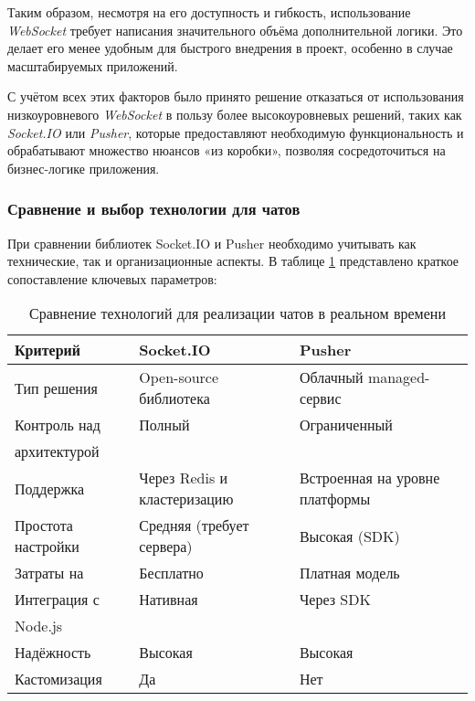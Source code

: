 Таким образом, несмотря на его доступность и гибкость, использование \textit{WebSocket} требует написания значительного объёма дополнительной логики. Это делает его менее удобным для быстрого внедрения в проект, особенно в случае масштабируемых приложений.

С учётом всех этих факторов было принято решение отказаться от использования низкоуровневого \textit{WebSocket} в пользу более высокоуровневых решений, таких как \textit{Socket.IO} или \textit{Pusher}, которые предоставляют необходимую функциональность и обрабатывают множество нюансов «из коробки», позволяя сосредоточиться на бизнес-логике приложения.


\subsubsection*{Сравнение и выбор технологии для чатов}

При сравнении библиотек Socket.IO и Pusher необходимо учитывать как технические, так и организационные аспекты. В таблице \ref{tab:chat-comparison} представлено краткое сопоставление ключевых параметров:

\begin{table}[h]
  \centering
  \caption{Сравнение технологий для реализации чатов в реальном времени}
  \small
  \label{tab:chat-comparison}
  \begin{tabular}{|l|p{5cm}|p{5cm}|}
    \hline
    \textbf{Критерий} & \textbf{Socket.IO}               & \textbf{Pusher}                 \\ \hline
    Тип решения      & Open-source библиотека           & Облачный managed-сервис         \\ \hline
    Контроль над     & Полный                           & Ограниченный                    \\ 
    архитектурой     &                                  &                                 \\ \hline
    Поддержка        & Через Redis и кластеризацию      & Встроенная на уровне платформы  \\ \hline
    Простота настройки & Средняя (требует сервера)      & Высокая (SDK)                   \\ \hline
    Затраты на       & Бесплатно                        & Платная модель                  \\ \hline
    Интеграция с     & Нативная                         & Через SDK                       \\ 
    Node.js          &                                  &                                 \\ \hline
    Надёжность       & Высокая                          & Высокая                         \\ \hline
    Кастомизация     & Да                               & Нет                             \\ \hline
  \end{tabular}
\end{table}

